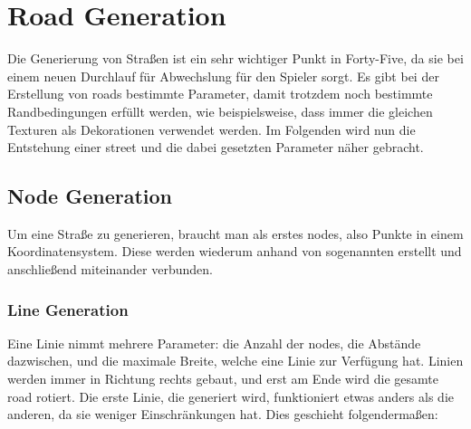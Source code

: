 
\section{Road Generation}\label{sec:road-generation}

\renewcommand{\kapitelautor}{Autor: Felix Zwickelstorfer}

Die Generierung von Straßen ist ein sehr wichtiger Punkt in Forty-Five, da sie bei einem neuen Durchlauf für Abwechslung für den Spieler sorgt.
Es gibt bei der Erstellung von roads bestimmte Parameter, damit trotzdem noch bestimmte Randbedingungen erfüllt werden, wie beispielsweise, dass immer die gleichen Texturen als Dekorationen verwendet werden.
Im Folgenden wird nun die Entstehung einer street und die dabei gesetzten Parameter näher gebracht.

\subsection{Node Generation}\label{subsec:node-generation}
Um eine Straße zu generieren, braucht man als erstes nodes, also Punkte in einem Koordinatensystem.
Diese werden wiederum anhand von sogenannten  erstellt und anschließend miteinander verbunden.

\subsubsection{Line Generation}\label{subsubsec:line-generation}
Eine Linie nimmt mehrere Parameter: die Anzahl der nodes, die Abstände dazwischen, und die maximale Breite, welche eine Linie zur Verfügung hat.
Linien werden immer in Richtung rechts gebaut, und erst am Ende wird die gesamte road rotiert.
Die erste Linie, die generiert wird, funktioniert etwas anders als die anderen, da sie weniger Einschränkungen hat.
Dies geschieht folgendermaßen:

